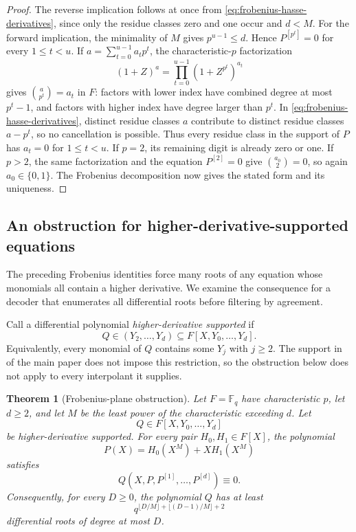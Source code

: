 \documentclass[11pt,letterpaper]{article}
\newtheorem{theorem}{Theorem}[section]
\theoremstyle{definition}
\newcommand{\F}{\mathbb{F}}
\begin{document}
\begin{proof}
The reverse implication follows at once from
\eqref{eq:frobenius-hasse-derivatives}, since only the residue classes zero
and one occur and \(d<M\).  For the forward implication, the minimality of
\(M\) gives \(p^{u-1}\leq d\).  Hence
\(P^{[p^t]}=0\) for every \(1\leq t<u\).  If
\(a=\sum_{t=0}^{u-1}a_tp^t\), the characteristic-\(p\) factorization
\[
  (1+Z)^a=\prod_{t=0}^{u-1}(1+Z^{p^t})^{a_t}
\]
gives \(\binom a{p^t}=a_t\) in \(F\): factors with lower index have
combined degree at most \(p^t-1\), and factors with higher index have
degree larger than \(p^t\). In
\eqref{eq:frobenius-hasse-derivatives}, distinct residue classes \(a\)
contribute to distinct residue classes \(a-p^t\), so no cancellation is
possible.  Thus every residue class in the support of \(P\) has
\(a_t=0\) for \(1\leq t<u\).  If \(p=2\), its remaining digit is already
zero or one.  If \(p>2\), the same factorization and the equation
\(P^{[2]}=0\) give \(\binom{a_0}{2}=0\), so again
\(a_0\in\{0,1\}\). The Frobenius
decomposition now gives the stated form and its uniqueness.
\end{proof}

\subsection{An obstruction for higher-derivative-supported equations}

The preceding Frobenius identities force many roots of any equation
whose monomials all contain a higher derivative. We examine the consequence
for a decoder that enumerates all differential roots before filtering by agreement.

Call a differential polynomial \emph{higher-derivative supported} if
\begin{equation}
  Q\in(Y_2,\ldots,Y_d)
  \subseteq F[X,Y_0,\ldots,Y_d].
  \label{eq:higher-derivative-supported}
\end{equation}
Equivalently, every monomial of \(Q\) contains some \(Y_j\) with
\(j\geq2\). The support in  of the main
paper does not impose this restriction, so the obstruction below does
not apply to every interpolant it supplies.

\begin{theorem}[Frobenius-plane obstruction]
\label{thm:frobenius-plane-obstruction}
Let \(F=\F_q\) have characteristic \(p\), let \(d\geq2\), and let \(M\) be
the least power of the characteristic exceeding \(d\).  Let
\[
  Q\in F[X,Y_0,\ldots,Y_d]
\]
be higher-derivative supported.  For every pair \(H_0,H_1\in F[X]\), the
polynomial
\[
  P(X)=H_0(X^M)+XH_1(X^M)
\]
satisfies
\begin{equation}
  Q(X,P,P^{[1]},\ldots,P^{[d]})\equiv0.
  \label{eq:frobenius-plane-identity}
\end{equation}
Consequently, for every \(D\geq0\), the polynomial \(Q\) has at least
\begin{equation}
  q^{\lfloor D/M\rfloor+\lfloor(D-1)/M\rfloor+2}
  \label{eq:frobenius-plane-root-count}
\end{equation}
differential roots of degree at most \(D\).
\end{theorem}
\end{document}
